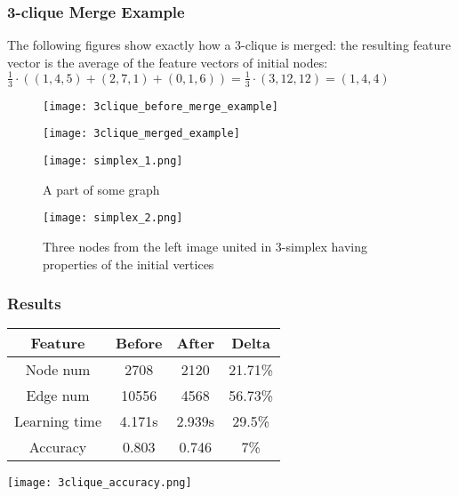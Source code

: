 \begin{frame}[allowframebreaks]
	\frametitle{3-clique Merge Example}

	The following figures show exactly how a 3-clique is merged: the resulting feature vector is the average of the feature vectors of initial nodes: $\frac{1}{3} \cdot \left( (1, 4, 5) + (2, 7, 1) + (0, 1, 6) \right) = \frac{1}{3} \cdot (3, 12, 12) = (1, 4, 4)$

	\begin{figure}[h]
		\begin{minipage}{.7\textwidth}
			\centering
			\texttt{[image: 3clique\_before\_merge\_example]}
		\end{minipage}%
		\begin{minipage}{.3\textwidth}
			\centering
			\texttt{[image: 3clique\_merged\_example]}
		\end{minipage}
	\end{figure}

	\framebreak

	\begin{figure}[h]
		\begin{multicols}{2}
			\centering
			\texttt{[image: simplex\_1.png]}
			\caption{A part of some graph}\label{fig:clique_merged}

			\centering
			\texttt{[image: simplex\_2.png]}
			\caption{Three nodes from the left image united in 3-simplex having properties of the initial vertices}
		\end{multicols}
	\end{figure}
\end{frame}

\begin{frame}[allowframebreaks, c]
	\frametitle{Results}

	\centering
	\begin{tabular}{ |c|c|c|c| }
		\hline
		Feature       & Before & After  & Delta   \\
		\hline
		Node num      & 2708   & 2120   & 21.71\% \\
		Edge num      & 10556  & 4568   & 56.73\% \\
		Learning time & 4.171s & 2.939s & 29.5\%  \\
		Accuracy      & 0.803  & 0.746  & 7\%     \\
		\hline
	\end{tabular}

	\framebreak

	\texttt{[image: 3clique\_accuracy.png]}
\end{frame}

